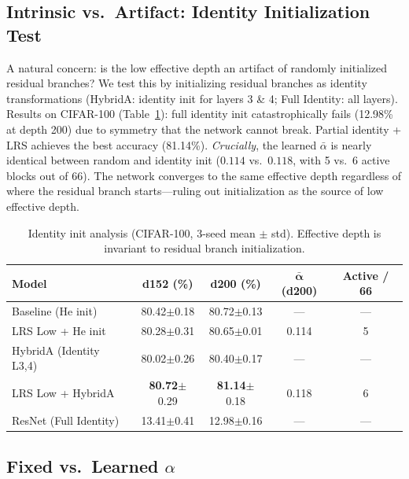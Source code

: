 \documentclass{bmvc2k}
\begin{document}
\subsection{Intrinsic vs.\ Artifact: Identity Initialization Test}
\label{sec:identity_init}

A natural concern: is the low effective depth an artifact of randomly initialized residual branches? We test this by initializing residual branches as identity transformations (HybridA: identity init for layers 3 \& 4; Full Identity: all layers). Results on CIFAR-100 (Table~\ref{tab:identity_init}): full identity init catastrophically fails (12.98\% at depth 200) due to symmetry that the network cannot break. Partial identity + LRS achieves the best accuracy (81.14\%). \emph{Crucially}, the learned $\bar{\alpha}$ is nearly identical between random and identity init ($0.114$ vs.\ $0.118$, with 5 vs.\ 6 active blocks out of 66). The network converges to the same effective depth regardless of where the residual branch starts---ruling out initialization as the source of low effective depth.

\begin{table}[!ht]
\centering
\small
\caption{Identity init analysis (CIFAR-100, 3-seed mean $\pm$ std). Effective depth is invariant to residual branch initialization.}
\label{tab:identity_init}
\begin{tabular}{lcccc}
\toprule
\textbf{Model} & \textbf{d152 (\%)} & \textbf{d200 (\%)} & $\mathbf{\bar{\alpha}}$ \textbf{(d200)} & \textbf{Active / 66} \\
\midrule
Baseline (He init) & 80.42$\pm$0.18 & 80.72$\pm$0.13 & --- & --- \\
LRS Low + He init & 80.28$\pm$0.31 & 80.65$\pm$0.01 & 0.114 & 5 \\
HybridA (Identity L3,4) & 80.02$\pm$0.26 & 80.40$\pm$0.17 & --- & --- \\
LRS Low + HybridA & \textbf{80.72}$\pm$0.29 & \textbf{81.14}$\pm$0.18 & 0.118 & 6 \\
ResNet (Full Identity) & 13.41$\pm$0.41 & 12.98$\pm$0.16 & --- & --- \\
\bottomrule
\end{tabular}
\end{table}

\subsection{Fixed vs.\ Learned $\alpha$}
\label{sec:fixed_alpha}
\end{document}
